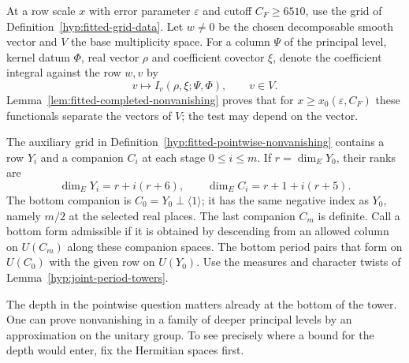 \begin{paramdefinition}\label{hyp:fitted-pointwise-nonvanishing}
At a row scale \(x\) with error parameter \(\varepsilon\) and cutoff
\(C_F\ge6510\), use the grid of Definition~\ref{hyp:fitted-grid-data}.
Let \(w\ne0\) be the chosen decomposable smooth vector and \(V\) the
base multiplicity space. For a column \(\Psi\) of the principal level,
kernel datum \(\Phi\), real vector \(\rho\) and coefficient covector \(\xi\),
denote the coefficient integral against the row \(w,v\) by
\[
         v\longmapsto I_v(\rho,\xi;\Psi,\Phi),\qquad v\in V.
\]
Lemma~\ref{lem:fitted-completed-nonvanishing} proves that for
\(x\ge x_0(\varepsilon,C_F)\) these functionals separate the vectors
of \(V\); the test may depend on the vector.
\end{paramdefinition}

The auxiliary grid in Definition~\ref{hyp:fitted-pointwise-nonvanishing}
contains a row \(Y_i\) and a companion \(C_i\) at each stage \(0\le i\le m\).
If \(r=\dim_E Y_0\), their ranks are
\[
 \dim_E Y_i=r+i(r+6),\qquad \dim_E C_i=r+1+i(r+5).
\]
The bottom companion is \(C_0=Y_0\perp\langle1\rangle\); it has
the same negative index as \(Y_0\), namely \(m/2\) at the selected
real places. The last companion \(C_m\) is definite. Call a bottom
form admissible if it is obtained by descending from an allowed column
on \(U(C_m)\) along these companion spaces. The bottom period pairs
that form on \(U(C_0)\) with the given row on \(U(Y_0)\). Use the
measures and character twists of Lemma~\ref{hyp:joint-period-towers}.

The depth in the pointwise question matters already at the bottom of
the tower. One can prove nonvanishing in a family of deeper principal
levels by an approximation on the unitary group. To see precisely where
a bound for the depth would enter, fix the Hermitian spaces first.

